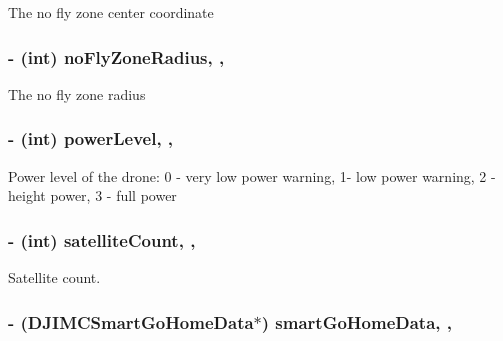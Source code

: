 The no fly zone center coordinate \hypertarget{interface_d_j_i_m_c_system_state_a79b5f1ed799acf989c4c755523df582a}{
\subsubsection[{no\+Fly\+Zone\+Radius}]{\setlength{\rightskip}{0pt plus 5cm}-\/ (int) no\+Fly\+Zone\+Radius\hspace{0.3cm}{\ttfamily [read]}, {\ttfamily [nonatomic]}, {\ttfamily [assign]}}}\label{interface_d_j_i_m_c_system_state_a79b5f1ed799acf989c4c755523df582a}
The no fly zone radius \hypertarget{interface_d_j_i_m_c_system_state_ab39cb3387140f0642d29d865ba33e166}{
\subsubsection[{power\+Level}]{\setlength{\rightskip}{0pt plus 5cm}-\/ (int) power\+Level\hspace{0.3cm}{\ttfamily [read]}, {\ttfamily [nonatomic]}, {\ttfamily [assign]}}}\label{interface_d_j_i_m_c_system_state_ab39cb3387140f0642d29d865ba33e166}
Power level of the drone\+: 0 -\/ very low power warning, 1-\/ low power warning, 2 -\/ height power, 3 -\/ full power \hypertarget{interface_d_j_i_m_c_system_state_a1d8684af50d70620b9166d2c6a469f63}{
\subsubsection[{satellite\+Count}]{\setlength{\rightskip}{0pt plus 5cm}-\/ (int) satellite\+Count\hspace{0.3cm}{\ttfamily [read]}, {\ttfamily [nonatomic]}, {\ttfamily [assign]}}}\label{interface_d_j_i_m_c_system_state_a1d8684af50d70620b9166d2c6a469f63}
Satellite count. \hypertarget{interface_d_j_i_m_c_system_state_a66a05759183d6c6bd20b309f274c189a}{
\subsubsection[{smart\+Go\+Home\+Data}]{\setlength{\rightskip}{0pt plus 5cm}-\/ ({\bf D\+J\+I\+M\+C\+Smart\+Go\+Home\+Data}$\ast$) smart\+Go\+Home\+Data\hspace{0.3cm}{\ttfamily [read]}, {\ttfamily [nonatomic]}, {\ttfamily [assign]}}}\label{interface_d_j_i_m_c_system_state_a66a05759183d6c6bd20b309f274c189a}
